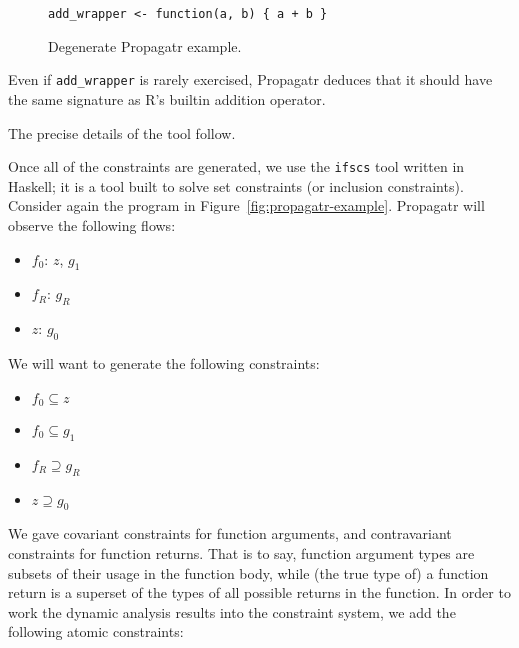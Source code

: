\documentclass[sigplan,10pt,review,anonymous]{acmart}\settopmatter{printfolios=true,printccs=false,printacmref=false}
\begin{document}
\begin{figure}[!hb]{\small\begin{lstlisting}[style=R]
add_wrapper <- function(a, b) { a + b }
\end{lstlisting}}\caption{Degenerate Propagatr example.}\label{fig:propagatr-degenerate}\end{figure}

Even if {\tt add\_wrapper} is rarely exercised, Propagatr deduces that it should have the same signature as R's builtin addition operator.

The precise details of the tool follow.

Once all of the constraints are generated, we use the {\tt ifscs} tool written in Haskell; it is a tool built to solve set constraints (or inclusion constraints).
Consider again the program in Figure~\ref{fig:propagatr-example}.
Propagatr will observe the following flows:

\begin{itemize}

\item $f_{0}$: $z$, $g_{1}$
\item $f_{R}$: $g_{R}$
\item $z$: $g_0$ 

\end{itemize}

We will want to generate the following constraints:

\begin{itemize}

\item $f_{0} \subseteq z$
\item $f_{0} \subseteq g_{1}$
\item $f_{R} \supseteq g_{R}$
\item $z \supseteq g_0$ 

\end{itemize}

 We gave covariant constraints for function arguments, and contravariant constraints for function returns.
That is to say, function argument types are subsets of their usage in the function body, while (the true type of) a function return is a superset of the types of all possible returns in the function. 
In order to work the dynamic analysis results into the constraint system, we add the following atomic constraints:
\end{document}
